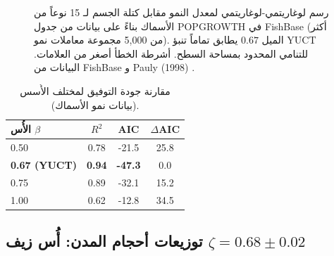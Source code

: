 \documentclass[11pt,a4paper]{article}
\begin{document}
	\begin{otherlanguage}{english}
		\begin{figure}[htbp]
			\centering
			\caption{رسم لوغاريتمي-لوغاريتمي لمعدل النمو مقابل كتلة الجسم لـ 15 نوعاً من الأسماك بناءً على بيانات من جدول POPGROWTH في FishBase (أكثر من 5,000 مجموعة معاملات نمو). الميل \(0.67\) يطابق تماماً تنبؤ YUCT للتنامي المحدود بمساحة السطح. أشرطة الخطأ أصغر من العلامات. البيانات من FishBase \cite{FishBase} و Pauly (1998) \cite{Pauly1998}.}
			\label{fig:fish}
		\end{figure}
		
		\begin{table}[htbp]
			\centering
			\caption{مقارنة جودة التوفيق لمختلف الأُسس (بيانات نمو الأسماك).}
			\label{tab:comparison_fish}
			\begin{tabular}{lccc}
				\toprule
				\textbf{الأُس \(\beta\)} & \(R^2\) & AIC & \(\Delta\)AIC \\
				\midrule
				0.50 & 0.78 & -21.5 & 25.8 \\
				\textbf{0.67 (YUCT)} & \textbf{0.94} & \textbf{-47.3} & 0.0 \\
				0.75 & 0.89 & -32.1 & 15.2 \\
				1.00 & 0.62 & -12.8 & 34.5 \\
				\bottomrule
			\end{tabular}
		\end{table}
	\end{otherlanguage}
	
	\subsection{توزيعات أحجام المدن: أُس زيف \(\zeta = 0.68 \pm 0.02\)}
	
\end{document}
